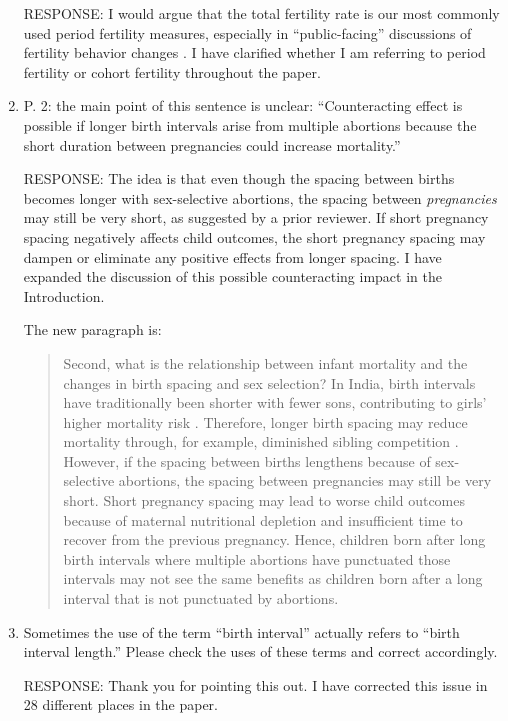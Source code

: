 \documentclass[letterpaper,12pt]{article}
\begin{document}
\begin{enumerate}[resume]
RESPONSE: I would argue that the total fertility rate is our most commonly used period 
fertility measures, especially in ``public-facing'' discussions of fertility behavior 
changes \citep[see the discussion in][]{Hotz1997,Bongaarts1999,Ni-Bhrolchain2011}.
I have clarified whether I am referring to period fertility or cohort fertility 
throughout the paper. 


\item  P. 2: the main point of this sentence is unclear: “Counteracting effect is possible if
longer birth intervals arise from multiple abortions because the short duration between
pregnancies could increase mortality.”

RESPONSE: The idea is that even though the spacing between births becomes longer with
sex-selective abortions, the spacing between \emph{pregnancies} may still be very short, as
suggested by a prior reviewer. If short pregnancy spacing negatively affects child
outcomes, the short pregnancy spacing may dampen or eliminate any positive effects from
longer spacing. 
I have expanded the discussion of this possible counteracting impact in the Introduction.

The new paragraph is:
\begin{quote}
Second, what is the relationship between infant mortality and the changes in birth spacing
and sex selection? 
In India, birth intervals have traditionally been shorter with fewer sons, contributing to 
girls' higher mortality risk
\citep{Whitworth2002,Bhalotra2008,Maitra2008,Jayachandran2011,Jayachandran2017a}. 
Therefore, longer birth spacing may reduce mortality through, for example, diminished 
sibling competition \citep{Conde-Agudelo2012,Molitoris2019}. 
However, if the spacing between births lengthens because of sex-selective abortions, the 
spacing between pregnancies may still be very short. 
Short pregnancy spacing may lead to worse child outcomes because of maternal nutritional 
depletion and insufficient time to recover from the previous pregnancy. 
Hence, children born after long birth intervals where multiple abortions have punctuated 
those intervals may not see the same benefits as children born after a long interval that 
is not punctuated by abortions.
\end{quote}

\item  Sometimes the use of the term “birth interval” actually refers to “birth interval
length.” Please check the uses of these terms and correct accordingly.

RESPONSE: Thank you for pointing this out. 
I have corrected this issue in 28 different places in the paper.



\end{enumerate}
\end{document}
